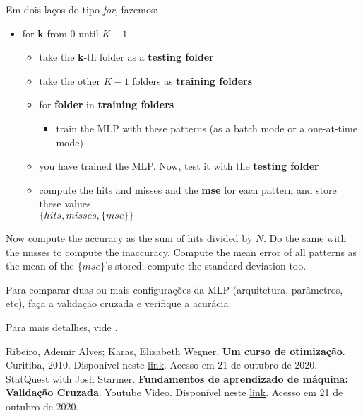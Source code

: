 \documentclass[12pt,a4paper]{article}
\begin{document}
Em dois laços do tipo \textit{for}, fazemos:
\begin{itemize}
\item for \textbf{k} from $0$ until $K-1$
\begin{itemize}
\item take the \textbf{k}-th folder as a \textbf{testing folder}
\item take the other $K-1$ folders as \textbf{training folders}
\item for \textbf{folder} in \textbf{training folders}
\begin{itemize}
\item train the MLP with these patterns (as a batch mode or a one-at-time mode)
\end{itemize}
\item you have  trained the MLP. Now, test it with the \textbf{testing folder}
\item compute the  hits and misses and the \textbf{mse} for each pattern and store these values \\$\{hits,misses,\{mse\}\}$
\end{itemize}
\end{itemize}
Now compute the accuracy as the sum of hits divided by $N$. Do the same with the misses to compute the inaccuracy. Compute the mean error of all patterns as the mean of the $\{mse\}$'s stored; compute the standard deviation too.

Para comparar duas ou mais configurações da MLP (arquitetura, parâmetros, etc), faça a validação cruzada e verifique a acurácia.

Para mais detalhes, vide \cite{cv}.

\begin{thebibliography}{9}
Ribeiro, Ademir Alves; Karas,  Elizabeth Wegner. \textbf{Um curso de otimização}. Curitiba, 2010. Disponível neste \href{https://www.ime.unicamp.br/~sandra/MS629/handouts/livro28jul.pdf}{link}. Acesso em 21 de outubro de 2020.
 StatQuest with Josh Starmer. \textbf{Fundamentos de aprendizado de máquina: Validação Cruzada}. Youtube Video. Disponível neste \href{https://youtu.be/fSytzGwwBVw}{link}. Acesso em 21 de outubro de 2020.
\end{thebibliography}
\end{document}
